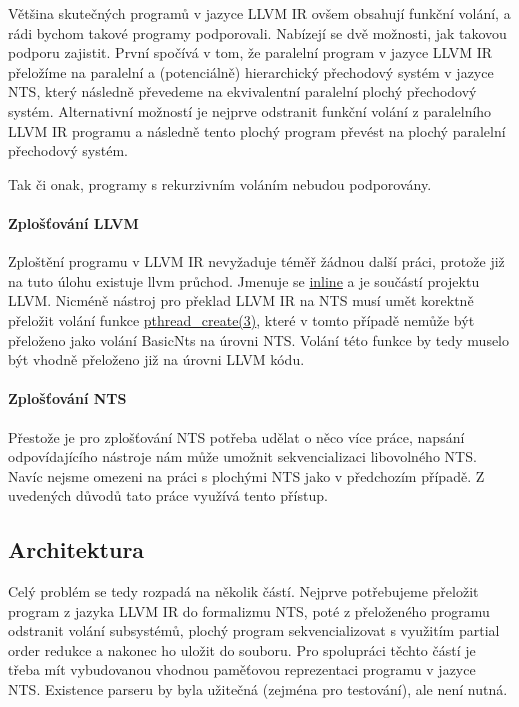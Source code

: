 \documentclass[10pt,a4paper,notitlepage]{report}
\begin{document}
Většina skutečných programů v jazyce LLVM IR ovšem obsahují funkční volání, a rádi bychom takové programy podporovali. Nabízejí se dvě možnosti, jak takovou podporu zajistit. První spočívá v tom, že paralelní program v jazyce LLVM IR přeložíme na paralelní a (potenciálně) hierarchický přechodový systém v jazyce NTS, který následně převedeme na ekvivalentní paralelní plochý přechodový systém. Alternativní možností je nejprve odstranit funkční volání z paralelního LLVM IR programu a následně tento plochý program převést na plochý paralelní přechodový systém.

Tak či onak, programy s rekurzivním voláním nebudou podporovány.

\paragraph{Zplošťování LLVM}
Zploštění programu v LLVM IR nevyžaduje téměř žádnou další práci, protože již na tuto úlohu existuje llvm průchod. Jmenuje se
\href{http://llvm.org/docs/Passes.html#inline-function-integration-inlining}
{inline} a je součástí projektu LLVM. Nicméně nástroj pro překlad LLVM IR na NTS musí umět korektně přeložit volání funkce
\href{http://man7.org/linux/man-pages/man3/pthread_create.3.html}
{pthread_create(3)}, které v tomto případě nemůže být přeloženo jako volání BasicNts na úrovni NTS. Volání této funkce by tedy muselo být vhodně přeloženo již na úrovni LLVM kódu.

\paragraph{Zplošťování NTS}
Přestože je pro zplošťování NTS potřeba udělat o něco více práce, napsání odpovídajícího nástroje nám může umožnit sekvencializaci libovolného NTS. Navíc nejsme omezeni na práci s plochými NTS jako v předchozím případě. Z uvedených důvodů tato práce využívá tento přístup.

\subsection{Architektura}
Celý problém se tedy rozpadá na několik částí. Nejprve potřebujeme přeložit program z jazyka LLVM IR do formalizmu NTS, poté z přeloženého programu odstranit volání subsystémů, plochý program sekvencializovat s využitím partial order redukce a nakonec ho uložit do souboru. Pro spolupráci těchto částí je třeba mít vybudovanou vhodnou paměťovou reprezentaci programu v jazyce NTS. Existence parseru by byla užitečná (zejména pro testování), ale není nutná.
\end{document}
